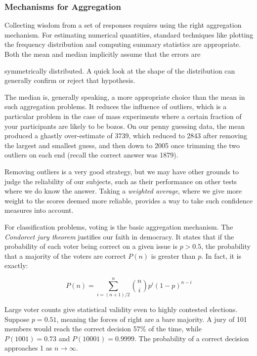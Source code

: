 \documentclass[10pt]{article}
\begin{document}
\subsubsection{Mechanisms for Aggregation}

Collecting wisdom from a set of responses requires using the right aggregation mechanism. For estimating numerical quantities, standard techniques like plotting the frequency distribution and computing summary statistics are appropriate. Both the mean and median implicitly assume that the errors are


symmetrically distributed. A quick look at the shape of the distribution can generally confirm or reject that hypothesis.

The median is, generally speaking, a more appropriate choice than the mean in such aggregation problems. It reduces the influence of outliers, which is a particular problem in the case of mass experiments where a certain fraction of your participants are likely to be bozos. On our penny guessing data, the mean produced a ghastly over-estimate of 3739, which reduced to 2843 after removing the largest and smallest guess, and then down to 2005 once trimming the two outliers on each end (recall the correct answer was 1879).

Removing outliers is a very good strategy, but we may have other grounds to judge the reliability of our subjects, such as their performance on other tests where we do know the answer. Taking a \textit{weighted average}, where we give more weight to the scores deemed more reliable, provides a way to take such confidence measures into account.

For classification problems, voting is the basic aggregation mechanism. The \textit{Condorcet jury theorem} justifies our faith in democracy. It states that if the probability of each voter being correct on a given issue is \(p > 0.5\), the probability that a majority of the voters are correct \(P(n)\) is greater than \(p\). In fact, it is exactly:

\[
P(n) = \sum_{i=(n+1)/2}^{n}\binom{n}{i} p^{i}(1-p)^{n-i}
\]

Large voter counts give statistical validity even to highly contested elections. Suppose \(p = 0.51\), meaning the forces of right are a bare majority. A jury of 101 members would reach the correct decision 57\% of the time, while \(P(1001) = 0.73\) and \(P(10001) = 0.9999\). The probability of a correct decision approaches 1 as \(n \rightarrow \infty\).
\end{document}

